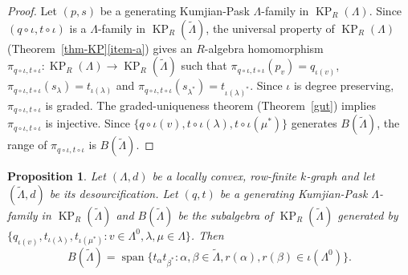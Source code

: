 \documentclass[a4paper,12pt]{amsart}
\numberwithin{equation}{section}
\newtheorem{prop}[thm]{Proposition}
\theoremstyle{definition}
\theoremstyle{remark}
\begin{document}
\begin{proof}
Let $(p,s)$ be a generating Kumjian-Pask $\Lambda$-family in $\operatorname{KP}_R(\Lambda)$.  Since $(q \circ \iota,t \circ \iota)$ 
is a $\Lambda$-family in $\operatorname{KP}_R({\tilde{\Lambda}})$, the universal property of $\operatorname{KP}_R(\Lambda)$ (Theorem~\ref{thm-KP}\eqref{item-a}) gives an $R$-algebra homomorphism  $\pi_{q \circ \iota,t \circ \iota}:\operatorname{KP}_R(\Lambda)\to \operatorname{KP}_R(\tilde\Lambda)$ such that $\pi_{q \circ \iota,t \circ \iota}(p_v)=q_{\iota(v)}$,  $\pi_{q \circ \iota,t \circ \iota}(s_\lambda)=t_{\iota(\lambda)}$ and $\pi_{q \circ \iota,t \circ \iota}(s_{\lambda^*})=t_{\iota(\lambda)^*}$.
Since $\iota$ is degree preserving, $\pi_{q \circ \iota,t \circ \iota}$ is graded.  The graded-uniqueness 
theorem (Theorem~\ref{gut})
implies  $\pi_{q \circ \iota,t \circ \iota}$ is injective.  Since  $\{q \circ \iota(v), t \circ \iota(\lambda), 
t \circ \iota(\mu^*)\}$ generates $B(\tilde\Lambda)$, the range of $\pi_{q \circ \iota,t \circ \iota}$ is $B(\tilde\Lambda)$.
\end{proof}

\begin{prop}
\label{lem:KPiotaL}
Let $(\Lambda,d)$ be a locally convex, row-finite $k$-graph and let $(\tilde{\Lambda}, d)$ be its
desourcification. Let $(q,t)$ be  a generating Kumjian-Pask $\Lambda$-family in $\operatorname{KP}_R(\tilde{\Lambda})$ and $B(\tilde\Lambda)$ 
be the subalgebra  of $\operatorname{KP}_R(\tilde{\Lambda})$ generated by $\{q_{\iota(v)}, t_{\iota(\lambda)}, t_{\iota(\mu^*)}:v\in\Lambda^0, \lambda,\mu\in\Lambda\}$.
Then
\[B(\tilde\Lambda) = {\operatorname{\mathrm{span}}}\{t_{\alpha}t_{\beta^*} : \alpha, \beta \in \tilde{\Lambda},
 r(\alpha),r(\beta) \in \iota(\Lambda^0)\}.\]
\end{prop}
\end{document}
